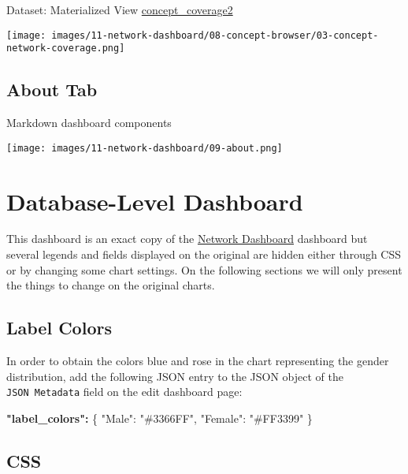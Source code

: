 \documentclass[
]{book}
\newenvironment{Shaded}{\begin{snugshade}}{\end{snugshade}}
\newcommand{\DataTypeTok}[1]{\textcolor[rgb]{0.13,0.29,0.53}{#1}}
\newcommand{\ErrorTok}[1]{\textcolor[rgb]{0.64,0.00,0.00}{\textbf{#1}}}
\newcommand{\FunctionTok}[1]{\textcolor[rgb]{0.00,0.00,0.00}{#1}}
\newcommand{\StringTok}[1]{\textcolor[rgb]{0.31,0.60,0.02}{#1}}
\begin{document}
Dataset: Materialized View \href{materialized-views-1.html\#concept_coverage2}{concept\_coverage2}

\texttt{[image: images/11-network-dashboard/08-concept-browser/03-concept-network-coverage.png]}

\hypertarget{about-tab}{%
\subsection*{About Tab}\label{about-tab}}

Markdown dashboard components

\texttt{[image: images/11-network-dashboard/09-about.png]}

\hypertarget{database-level-dashboard}{%
\section{Database-Level Dashboard}\label{database-level-dashboard}}

This dashboard is an exact copy of the \protect\hyperlink{PerDatabaseDashboard}{Network Dashboard} dashboard but several legends and fields
displayed on the original are hidden either through CSS or by changing some chart settings.
On the following sections we will only present the things to change on the original charts.

\hypertarget{label-colors-1}{%
\subsection*{Label Colors}\label{label-colors-1}}

In order to obtain the colors blue and rose in the chart representing the gender distribution,
add the following JSON entry to the JSON object of the \texttt{JSON\ Metadata} field on the edit dashboard page:

\begin{Shaded}
\begin{Highlighting}[]
\ErrorTok{"label\_colors":} \FunctionTok{\{}
    \DataTypeTok{"Male"}\FunctionTok{:} \StringTok{"\#3366FF"}\FunctionTok{,}
    \DataTypeTok{"Female"}\FunctionTok{:} \StringTok{"\#FF3399"}
\FunctionTok{\}}
\end{Highlighting}
\end{Shaded}

\hypertarget{css-1}{%
\subsection*{CSS}\label{css-1}}
\end{document}
